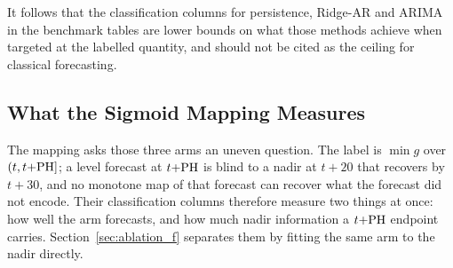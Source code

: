 It follows that the classification columns for persistence, Ridge-AR and ARIMA
in the benchmark tables are lower bounds on what those methods achieve when
targeted at the labelled quantity, and should not be cited as the ceiling for
classical forecasting.

\subsection{What the Sigmoid Mapping Measures}
\label{sec:appendix_sigmoid}

The mapping asks those three arms an uneven question. The label is $\min g$ over
$(t, t{+}\mathrm{PH}]$; a level forecast at $t{+}\mathrm{PH}$ is blind to a nadir at $t{+}20$
that recovers by $t{+}30$, and no monotone map of that forecast can recover what
the forecast did not encode. Their classification columns therefore measure two
things at once: how well the arm forecasts, and how much nadir information a
$t{+}\mathrm{PH}$ endpoint carries. Section~\ref{sec:ablation_f} separates them by
fitting the same arm to the nadir directly.
